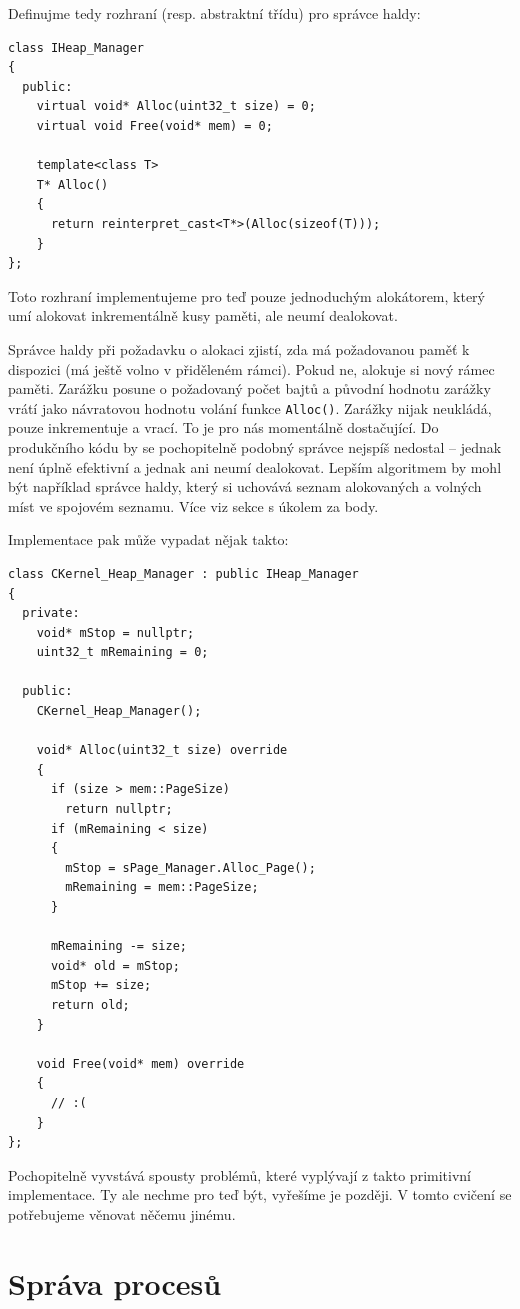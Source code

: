 \documentclass{article}
\begin{document}
Definujme tedy rozhraní (resp. abstraktní třídu) pro správce haldy:
\begin{lstlisting}
class IHeap_Manager
{
  public:
    virtual void* Alloc(uint32_t size) = 0;
    virtual void Free(void* mem) = 0;

    template<class T>
    T* Alloc()
    {
      return reinterpret_cast<T*>(Alloc(sizeof(T)));
    }
};
\end{lstlisting}

Toto rozhraní implementujeme pro teď pouze jednoduchým alokátorem, který umí alokovat inkrementálně kusy paměti, ale neumí dealokovat.

Správce haldy při požadavku o alokaci zjistí, zda má požadovanou paměť k dispozici (má ještě volno v přiděleném rámci). Pokud ne, alokuje si nový rámec paměti. Zarážku posune o požadovaný počet bajtů a původní hodnotu zarážky vrátí jako návratovou hodnotu volání funkce \texttt{Alloc()}. Zarážky nijak neukládá, pouze inkrementuje a vrací. To je pro nás momentálně dostačující. Do produkčního kódu by se pochopitelně podobný správce nejspíš nedostal -- jednak není úplně efektivní a jednak ani neumí dealokovat. Lepším algoritmem by mohl být například správce haldy, který si uchovává seznam alokovaných a volných míst ve spojovém seznamu. Více viz sekce s úkolem za body.

Implementace pak může vypadat nějak takto:
\begin{lstlisting}
class CKernel_Heap_Manager : public IHeap_Manager
{
  private:
    void* mStop = nullptr;
    uint32_t mRemaining = 0;

  public:
    CKernel_Heap_Manager();

    void* Alloc(uint32_t size) override
    {
      if (size > mem::PageSize)
        return nullptr;
      if (mRemaining < size)
      {
        mStop = sPage_Manager.Alloc_Page();
        mRemaining = mem::PageSize;
      }
  
      mRemaining -= size;
      void* old = mStop;
      mStop += size;
      return old;
    }

    void Free(void* mem) override
    {
      // :(
    }
};
\end{lstlisting}

Pochopitelně vyvstává spousty problémů, které vyplývají z takto primitivní implementace. Ty ale nechme pro teď být, vyřešíme je později. V tomto cvičení se potřebujeme věnovat něčemu jinému.

\section{Správa procesů}
\end{document}
